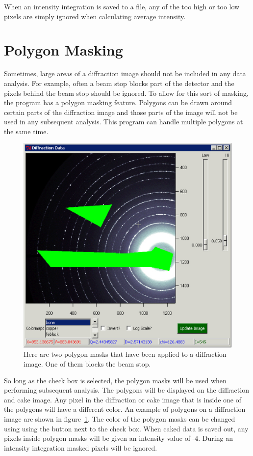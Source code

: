 When an intensity integration is saved to a file, 
any of the too high or too low pixels are simply ignored when 
calculating average intensity. 

\section{Polygon Masking}

Sometimes, large areas of a diffraction image should not
be included in any data analysis. For example, 
often a beam stop blocks part of the detector
and the pixels behind the beam stop should be ignored. 
To allow for this sort of masking, the program has a 
polygon masking feature. Polygons can be drawn around 
certain parts of the diffraction image and those parts 
of the image will not be used in any subsequent analysis. 
This program can handle multiple polygons at the same time.

\begin{figure}
    \centering
    \includegraphics[scale=.75]{figures/Displayed_Polygon.eps}
    \caption{Here are two polygon masks that have been applied
    to a diffraction image. One of them blocks the beam stop.}
    \label{Displayed_Polygon}
\end{figure}

So long as the  check box is
selected, the polygon masks will be used 
when performing subsequent analysis. 
The polygons will be displayed on the diffraction and cake image. 
Any pixel in the diffraction or cake image that is inside one of
the polygons will have a different color.
An example of polygons on a diffraction image are 
shown in figure~\ref{Displayed_Polygon}.
The color of the polygon masks can be changed using 
using the  button
next to the  check box.
When caked data is saved out, any pixels inside 
polygon masks will be given an intensity 
value of -4. During an intensity integration 
masked pixels will be ignored.

